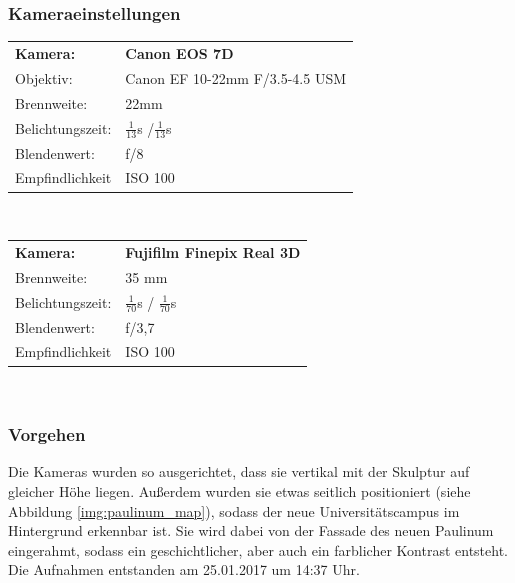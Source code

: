 \documentclass[liststotoc,bibtotoc,fontsize=14pt,]{scrreprt}
\begin{document}
		\subsubsection{Kameraeinstellungen}
				\begin{tabular}{ll}
					\textbf{Kamera:} &\textbf{Canon EOS 7D} \\
					Objektiv: &Canon EF 10-22mm F/3.5-4.5 USM\\		
					Brennweite:& 22mm \\
					Belichtungszeit: & $\frac{1}{13}$s /$\frac{1}{13}$s\\
					Blendenwert: & f/8\\
					Empfindlichkeit & ISO 100 \\
				\end{tabular}\\
				
				\begin{tabular}{ll}
					\textbf{Kamera:} &\textbf{Fujifilm Finepix Real 3D} \\
					Brennweite:& 35 mm \\
					Belichtungszeit: & $\frac{1}{70}$s / $\frac{1}{70}$s\\
					Blendenwert: & f/3,7\\
					Empfindlichkeit & ISO 100 \\
				\end{tabular}\\


	\subsubsection{Vorgehen}
	Die Kameras wurden so ausgerichtet, dass sie vertikal mit der Skulptur auf gleicher Höhe liegen. Außerdem wurden sie etwas seitlich positioniert (siehe Abbildung \ref{img:paulinum_map}), sodass der neue Universitätscampus im Hintergrund erkennbar ist. Sie wird dabei von der Fassade des neuen Paulinum eingerahmt, sodass ein geschichtlicher, aber auch ein farblicher Kontrast entsteht. Die Aufnahmen entstanden am 25.01.2017 um 14:37 Uhr. 
	
\end{document}
